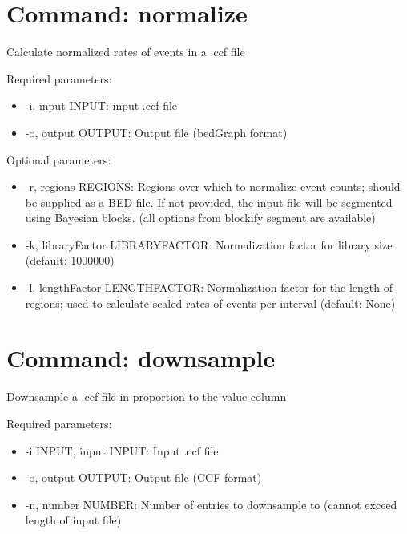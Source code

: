 \documentclass[letterpaper,10pt,english]{sphinxmanual}
\begin{document}
\chapter{Command: normalize}
\label{\detokenize{pages/normalize:command-normalize}}\label{\detokenize{pages/normalize::doc}}
Calculate normalized rates of events in a .ccf file

Required parameters:
\begin{itemize}
\item {} 
-i, \textendash{}input INPUT: input .ccf file

\item {} 
-o, \textendash{}output OUTPUT: Output file (bedGraph format)

\end{itemize}

Optional parameters:
\begin{itemize}
\item {} 
-r, \textendash{}regions REGIONS: Regions over which to normalize event counts; should be supplied as a BED file. If not provided, the input file will be segmented using Bayesian blocks. (all options from blockify segment are available)

\item {} 
-k, \textendash{}libraryFactor LIBRARYFACTOR: Normalization factor for library size (default: 1000000)

\item {} 
-l, \textendash{}lengthFactor LENGTHFACTOR: Normalization factor for the length of regions; used to calculate scaled rates of events per interval (default: None)

\end{itemize}


\chapter{Command: downsample}
\label{\detokenize{pages/downsample:command-downsample}}\label{\detokenize{pages/downsample::doc}}
Downsample a .ccf file in proportion to the value column

Required parameters:
\begin{itemize}
\item {} 
-i INPUT, \textendash{}input INPUT: Input .ccf file

\item {} 
-o, \textendash{}output OUTPUT: Output file (CCF format)

\item {} 
-n, \textendash{}number NUMBER: Number of entries to downsample to (cannot exceed length of input file)

\end{itemize}
\end{document}
